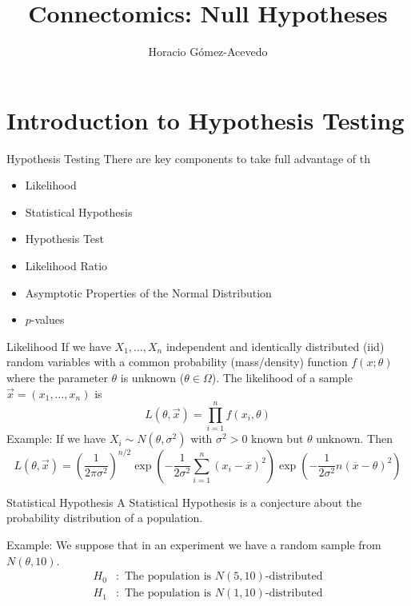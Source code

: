 \documentclass{beamer}
\title{Connectomics: Null Hypotheses}
\author{Horacio G\'omez-Acevedo}
\begin{document}
	\begin{frame}[plain]
		\maketitle
	\end{frame}
\section{Introduction to Hypothesis Testing}	
\begin{frame}{Hypothesis Testing}
There are key components to take full advantage of th

\begin{itemize}
	\item Likelihood
	\item Statistical Hypothesis
	\item Hypothesis Test
	\item Likelihood Ratio
	\item Asymptotic Properties of the Normal Distribution
	\item $p$-values
\end{itemize}
\end{frame}
\begin{frame}{Likelihood}
	If we have $X_1,\ldots, X_n$ independent and identically distributed (iid) random variables with a common probability (mass/density) function $f(x;\theta)$ where the parameter $\theta$ is unknown ($\theta \in \Omega$). The likelihood of a sample $\vec{x}=(x_1,\ldots,x_n)$ is 
	\begin{equation*}
		L(\theta,\vec{x})= \prod_{i=1}^n f(x_i,\theta)
	\end{equation*}
Example: If we have $X_i \sim N(\theta,\sigma^2)$ with $\sigma^2>0$ known but $\theta$ unknown. Then
\begin{equation*}
L(\theta,\vec{x})= \left(\frac{1}{2\pi \sigma^2}\right)^{n/2}
\exp\left(- \frac{1}{2\sigma^2}\sum_{i=1}^n (x_i-\overline{x})^2\right)\exp\left(- \frac{1}{2\sigma^2}n(\overline{x}-\theta)^2\right)
\end{equation*}
\end{frame}

\begin{frame}{Statistical Hypothesis}
	A Statistical Hypothesis is a conjecture about the probability distribution of a population. 
	
Example: We suppose that in an experiment we have a random sample from $N(\theta,10)$. 
\begin{equation*}
	\begin{split}
		H_0 &\colon \text{ The population is } N(5,10) \text{-distributed}\\
		H_1 &\colon \text{ The population is } N(1,10) \text{-distributed}
	\end{split}
\end{equation*}
\end{frame}
\end{document}
